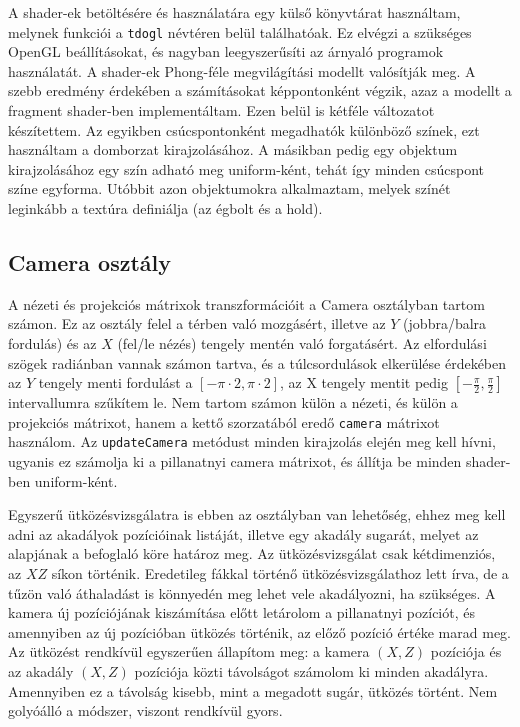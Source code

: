 A shader-ek betöltésére és használatára egy külső könyvtárat használtam, melynek funkciói a \texttt{tdogl} névtéren belül találhatóak. Ez elvégzi a szükséges OpenGL beállításokat, és nagyban leegyszerűsíti az árnyaló programok használatát. A shader-ek Phong-féle megvilágítási modellt valósítják meg. A szebb eredmény érdekében a számításokat képpontonként végzik, azaz a modellt a fragment shader-ben implementáltam. Ezen belül is kétféle változatot készítettem. Az egyikben csúcspontonként megadhatók különböző színek, ezt használtam a domborzat kirajzolásához. A másikban pedig egy objektum kirajzolásához egy szín adható meg uniform-ként, tehát így minden csúcspont színe egyforma. Utóbbit azon objektumokra alkalmaztam, melyek színét leginkább a textúra definiálja (az égbolt és a hold).

\subsection{Camera osztály}

A nézeti és projekciós mátrixok transzformációit a Camera osztályban tartom számon. Ez az osztály felel a térben való mozgásért, illetve az $Y$ (jobbra/balra fordulás) és az $X$ (fel/le nézés) tengely mentén való forgatásért. 
Az elfordulási szögek radiánban vannak számon tartva, és a túlcsordulások elkerülése érdekében az $Y$ tengely menti fordulást a $[-\pi \cdot 2, \pi \cdot 2]$, az X tengely mentit pedig $\left[-\frac{\pi}{2}, \frac{\pi}{2}\right]$ intervallumra szűkítem le. Nem tartom számon külön a nézeti, és külön a projekciós mátrixot, hanem a kettő szorzatából eredő \texttt{camera} mátrixot használom. Az \texttt{updateCamera} metódust minden kirajzolás elején meg kell hívni, ugyanis ez számolja ki a pillanatnyi camera mátrixot, és állítja be minden shader-ben uniform-ként. 

Egyszerű ütközésvizsgálatra is ebben az osztályban van lehetőség, ehhez meg kell adni az akadályok pozícióinak listáját, illetve egy akadály sugarát, melyet az alapjának a befoglaló köre határoz meg. Az ütközésvizsgálat csak kétdimenziós, az $XZ$ síkon történik. Eredetileg fákkal történő ütközésvizsgálathoz lett írva, de a tűzön való áthaladást is könnyedén meg lehet vele akadályozni, ha szükséges. A kamera új pozíciójának kiszámítása előtt letárolom a pillanatnyi pozíciót, és amennyiben az új pozícióban ütközés történik, az előző pozíció értéke marad meg. Az ütközést rendkívül egyszerűen állapítom meg: a kamera $(X, Z)$ pozíciója és az akadály $(X, Z)$ pozíciója közti távolságot számolom ki minden akadályra. Amennyiben ez a távolság kisebb, mint a megadott sugár, ütközés történt. Nem golyóálló a módszer, viszont rendkívül gyors.

